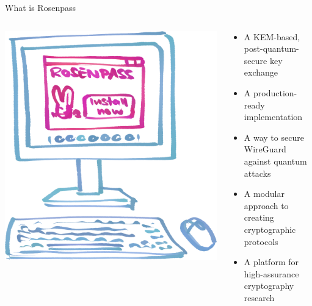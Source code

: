 \begin{frame}{What is Rosenpass}
  \begin{columns}[c]
    \begin{column}{.3\linewidth}
      \includegraphics[width=.8\linewidth]{graphics/Illu-install.png}
    \end{column}

    \begin{column}{.70\linewidth}
      \begin{itemize}
        \item A KEM-based, post-quantum-secure key exchange
        \item A production-ready implementation
        \item A way to secure WireGuard against quantum attacks
        \item A modular approach to creating cryptographic protocols
        \item A platform for high-assurance cryptography research
      \end{itemize}
    \end{column}
  \end{columns}
\end{frame}

